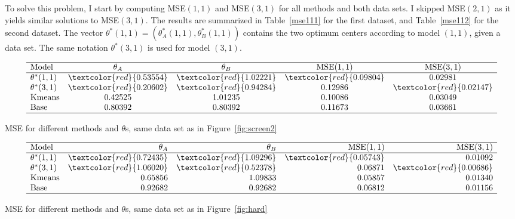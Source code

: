 \documentclass[oneside,10pt]{book}
\renewcommand{\arraystretch}{1.4} %
\begin{document}
To solve this problem, I start by computing MSE$(1,1)$ and MSE$(3,1)$ for all methods and both data sets.
I skipped MSE$(2,1)$ as it yields similar solutions to MSE$(3,1)$. The results are summarized in
Table~\ref{mse111} for the first dataset, and Table~\ref{mse112} for the second dataset. The vector
$\theta^*(1, 1)=(\theta_A^*(1, 1),\theta_B^*(1, 1))$ contains the two optimum centers according to model $(1,1)$, given a data set. The same notation
$\theta^*(3, 1)$
is used for model $(3,1)$.

\renewcommand{\arraystretch}{1.2} %
\begin{table}[H]
\[
\begin{array}{lcccc}
\hline
  \text{Model} &  \theta_A  & \theta_B & \text{MSE}(1,1) & \text{MSE}(3,1)  \\
\hline
\theta^*(1,1)	&	\textcolor{red}{0.53554}&	\textcolor{red}{1.02221}&	\textcolor{red}{0.09804}&	0.02981\\
\theta^*(3,1)	&	\textcolor{red}{0.20602}&	\textcolor{red}{0.94284}&	0.12986&	\textcolor{red}{0.02147}\\
\text{Kmeans}	&	0.42525&	1.01235&	0.10086&	0.03049\\
\text{Base}	&	0.80392&	0.80392&	0.11673&	0.03661\\
\hline
\end{array}
\]
\caption{\label{mse111} MSE for different methods and $\theta$s, same data set as in Figure~\ref{fig:screen2}}
\end{table}
\renewcommand{\arraystretch}{1.0} %
\renewcommand{\arraystretch}{1.2} %



\begin{table}[H]
\[
\begin{array}{lrrrr}
\hline
 \text{Model} &  \theta_A  & \theta_B & \text{MSE}(1,1) & \text{MSE}(3,1)  \\
\hline
\theta^*(1,1)	&	\textcolor{red}{0.72435} & \textcolor{red}{1.09296} & \textcolor{red}{0.05743} & 0.01092\\
\theta^*(3,1)	&	\textcolor{red}{1.06020} & \textcolor{red}{0.52378} & 0.06871 & \textcolor{red}{0.00686}\\
\text{Kmeans}	&	0.65856 & 1.09833 & 0.05857 & 0.01340\\
\text{Base}	&	0.92682 & 0.92682 & 0.06812 & 0.01156\\
\hline
\end{array}
\]
\caption{\label{mse112} MSE for different methods and $\theta$s, same data set as in Figure~\ref{fig:hard}}
\end{table}
\renewcommand{\arraystretch}{1.0} %
\end{document}
